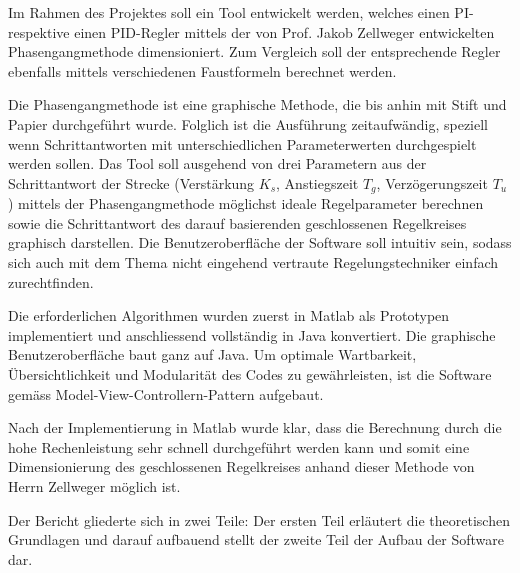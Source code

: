 Im Rahmen des Projektes soll ein  Tool entwickelt werden, welches einen PI-  
respektive einen PID-Regler mittels der von Prof. Jakob Zellweger entwickelten
Phasengangmethode                                                               
dimensioniert. Zum Vergleich  soll der entsprechende Regler  ebenfalls mittels
verschiedenen  Faustformeln berechnet  werden. 

Die  Phasengangmethode ist  eine
graphische Methode, die bis anhin mit Stift und Papier durchgef\"uhrt
wurde. Folglich  ist die  Ausf\"uhrung zeitaufw\"andig,  speziell wenn
Schrittantworten mit unterschiedlichen  Parameterwerten  durchgespielt
werden sollen. Das Tool soll ausgehend von drei Parametern aus der Schrittantwort der Strecke 
(Verst\"arkung  $K_s$, Anstiegszeit  $T_g$, Verz\"ogerungszeit  $T_u$) mittels
der Phasengangmethode  m\"oglichst ideale  Regelparameter berechnen  sowie die
Schrittantwort  des darauf  basierenden  geschlossenen Regelkreises  graphisch
darstellen. Die Benutzeroberfl\"ache  der Software soll intuitiv  sein, sodass
sich auch mit  dem Thema nicht eingehend  vertraute Regelungstechniker einfach
zurechtfinden.

Die  erforderlichen   Algorithmen  wurden   zuerst   in  Matlab 
als  Prototypen   implementiert  und   anschliessend  vollst\"andig   in  Java
konvertiert. Die  graphische Benutzeroberfl\"ache baut ganz  auf Java. Um
optimale  Wartbarkeit,  \"Ubersichtlichkeit  und Modularit\"at  des  Codes  zu
gew\"ahrleisten,  ist  die  Software  gem\"ass  Model-View-Controllern-Pattern
aufgebaut.

Nach  der Implementierung in  Matlab  wurde klar,  dass  die  Berechnung durch  die
hohe Rechenleistung  sehr schnell  durchgef\"uhrt werden  kann und  somit eine
Dimensionierung des geschlossenen Regelkreises anhand dieser Methode von Herrn
Zellweger m\"oglich ist.

Der  Bericht gliederte  sich  in  zwei Teile: Der ersten  Teil erläutert
 die  theoretischen  Grundlagen und  darauf  aufbauend stellt
der zweite  Teil   der Aufbau  der  Software dar.
